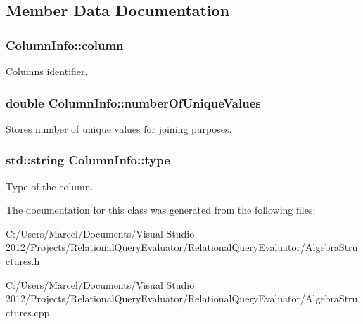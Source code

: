 \subsection{Member Data Documentation}
\hypertarget{class_column_info_a13c87a82665272f3eb3e18a8323d0d7e}{
\subsubsection[{column}]{ Column\+Info\+::column}}\label{class_column_info_a13c87a82665272f3eb3e18a8323d0d7e}
Columns identifier. \hypertarget{class_column_info_add402bfa7bed26aa6072c5da9b06dda9}{
\subsubsection[{number\+Of\+Unique\+Values}]{\setlength{\rightskip}{0pt plus 5cm}double Column\+Info\+::number\+Of\+Unique\+Values}}\label{class_column_info_add402bfa7bed26aa6072c5da9b06dda9}
Stores number of unique values for joining purposes. \hypertarget{class_column_info_add303d9d4415fc18b790d9a904831c29}{
\subsubsection[{type}]{\setlength{\rightskip}{0pt plus 5cm}std\+::string Column\+Info\+::type}}\label{class_column_info_add303d9d4415fc18b790d9a904831c29}
Type of the column. 

The documentation for this class was generated from the following files\+:\begin{DoxyCompactItemize}
\item 
C\+:/\+Users/\+Marcel/\+Documents/\+Visual Studio 2012/\+Projects/\+Relational\+Query\+Evaluator/\+Relational\+Query\+Evaluator/Algebra\+Structures.\+h\item 
C\+:/\+Users/\+Marcel/\+Documents/\+Visual Studio 2012/\+Projects/\+Relational\+Query\+Evaluator/\+Relational\+Query\+Evaluator/Algebra\+Structures.\+cpp\end{DoxyCompactItemize}
